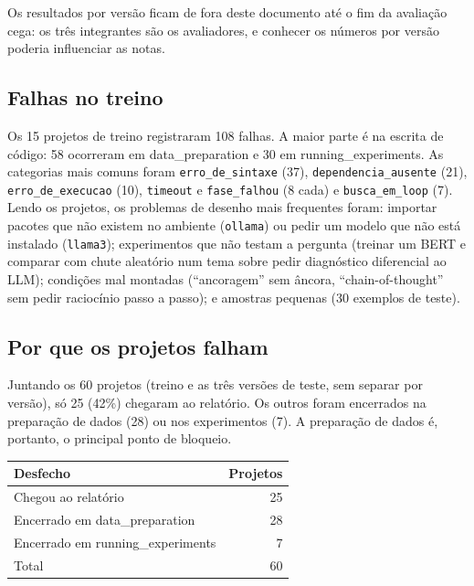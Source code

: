 \documentclass[11pt,a4paper]{article}
\newcommand{\fase}[1]{\textsf{#1}}
\begin{document}
Os resultados por versão ficam de fora deste documento até o fim da avaliação cega: os três
integrantes são os avaliadores, e conhecer os números por versão poderia influenciar as notas.

\subsection{Falhas no treino}

Os 15 projetos de treino registraram 108 falhas. A maior parte é na escrita de código: 58
ocorreram em \fase{data\_preparation} e 30 em \fase{running\_experiments}. As categorias mais
comuns foram \texttt{erro\_de\_sintaxe} (37), \texttt{dependencia\_ausente} (21),
\texttt{erro\_de\_execucao} (10), \texttt{timeout} e \texttt{fase\_falhou} (8 cada) e
\texttt{busca\_em\_loop} (7). Lendo os projetos, os problemas de desenho mais frequentes foram:
importar pacotes que não existem no ambiente (\texttt{ollama}) ou pedir um modelo que não está
instalado (\texttt{llama3}); experimentos que não testam a pergunta (treinar um BERT e comparar
com chute aleatório num tema sobre pedir diagnóstico diferencial ao LLM); condições mal montadas
(``ancoragem'' sem âncora, ``chain-of-thought'' sem pedir raciocínio passo a passo); e amostras
pequenas (30 exemplos de teste).

\subsection{Por que os projetos falham}
\label{sec:porque}

Juntando os 60 projetos (treino e as três versões de teste, sem separar por versão), só 25
(42\%) chegaram ao relatório. Os outros foram encerrados na preparação de dados (28) ou nos
experimentos (7). A preparação de dados é, portanto, o principal ponto de bloqueio.

\begin{center}
\small
\begin{tabular}{lr}
\toprule
Desfecho & Projetos \\
\midrule
Chegou ao relatório & 25 \\
Encerrado em \fase{data\_preparation} & 28 \\
Encerrado em \fase{running\_experiments} & 7 \\
\midrule
Total & 60 \\
\bottomrule
\end{tabular}
\end{center}
\end{document}
